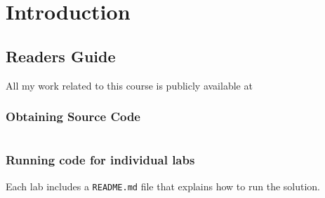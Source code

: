 \chapter{Introduction}
\section{Readers Guide}
All my work related to this course is publicly available at

\subsection{Obtaining Source Code}
\inputminted{sh}{code/obtaining-source.sh}

\subsection{Running code for individual labs}
Each lab includes a \texttt{README.md} file that explains how to run the solution.
